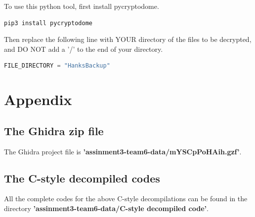 \documentclass[11pt]{article}
\begin{document}


To use this python tool, first install pycryptodome.
\begin{lstlisting}
pip3 install pycryptodome
\end{lstlisting}

Then replace the following line with YOUR directory of the files to be decrypted, and DO NOT add a '/' to the end of your directory.
\begin{lstlisting}[language=python]
FILE_DIRECTORY = "HanksBackup"
\end{lstlisting}

\newpage
\appendix
\section{Appendix}
\subsection{The Ghidra zip file}
The Ghidra project file is \textbf{'assinment3-team6-data/mYSCpPoHAih.gzf'}.

\subsection{The C-style decompiled codes} \label{C-style decompiled codes}
All the complete codes for the above C-style decompilations can be found in the directory \textbf{'assinment3-team6-data/C-style decompiled code'}.
\end{document}
